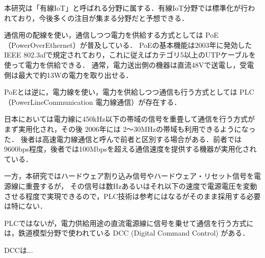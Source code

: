 
本研究は「有線IoT」と呼ばれる分野に属する．有線IoT分野では標準化が行われており，今後多くの注目が集まる分野だと予想できる．



通信用の配線を使い，通信しつつ電力を供給する方式としては PoE（PowerOverEthernet）が普及している．
PoEの基本機能は2003年に発効したIEEE 802.3afで規定されており，これに従えばカテゴリ5以上のUTPケーブルを使って電力を供給できる．
通常，電力送出側の機器は直流48Vで送電し，受電側は最大で約13Wの電力を取り出せる．


PoEとは逆に，電力線を使い，電力を供給しつつ通信も行う方式としては PLC（PowerLineCommunication 電力線通信）が存在する．


日本においては電力線に450kHz以下の帯域の信号を重畳して通信を行う方式がまず実用化され，その後 2006年には 2〜30MHzの帯域も利用できるようになった．
後者は高速電力線通信と呼んで前者と区別する場合がある．前者では9600bps程度，後者では100Mbpsを超える通信速度を提供する機器が実用化されている．

一方，本研究ではハードウェア割り込み信号やハードウェア・リセット信号を電源線に重畳するが，
その信号は数Hzあるいはそれ以下の速度で電源電圧を変動させる程度で実現できるので，PLC技術は参考にはなるがそのまま採用する必要は特にない．


PLCではないが，電力供給用途の直流電源線に信号を乗せて通信を行う方式には，鉄道模型分野で使われている DCC (Digital Command Control) がある．

DCCは...



